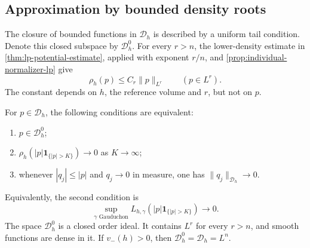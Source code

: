 \subsection{Approximation by bounded density roots}

The closure of bounded functions in $\mathcal D_h$ is described by a uniform tail condition. Denote this closed subspace by $\mathcal D_h^0$. For every $r>n$, the lower-density estimate in \cref{thm:lp-potential-estimate}, applied with exponent $r/n$, and \cref{prop:individual-normalizer-lp} give
\begin{equation}\label{eq:root-subcritical-bound}
 \rho_h(p)\leq C_r\|p\|_{L^r}\qquad(p\in L^r).
\end{equation}
The constant depends on $h$, the reference volume and $r$, but not on $p$.

\begin{proposition}\label{prop:root-uniform-tails}
For $p\in\mathcal D_h$, the following conditions are equivalent:
\begin{enumerate}
\item $p\in\mathcal D_h^0$;
\item $\rho_h(|p|\mathbf1_{\{|p|>K\}})\to0$ as $K\to\infty$;
\item whenever $|q_j|\leq|p|$ and $q_j\to0$ in measure, one has $\|q_j\|_{\mathcal D_h}\to0$.
\end{enumerate}
Equivalently, the second condition is
\[
 \sup_{\gamma\text{ Gauduchon}}
       L_{h,\gamma}(|p|\mathbf1_{\{|p|>K\}})\longrightarrow0.
\]
The space $\mathcal D_h^0$ is a closed order ideal. It contains $L^r$ for every $r>n$, and smooth functions are dense in it. If $v_-(h)>0$, then $\mathcal D_h^0=\mathcal D_h=L^n$.
\end{proposition}
